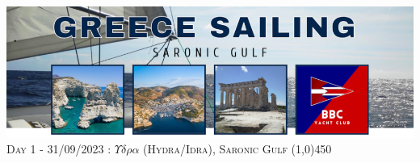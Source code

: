 \documentclass[12pt,a4paper,oneside]{article}
\begin{document}

\begin{center}
\includegraphics[scale=0.5]{../images/saronic_header_small.png} \\
{\Large \textsc{Day 1 - 31/09/2023 : $\Upsilon\delta\rho\alpha$ (Hydra/Idra), Saronic Gulf}}
\line(1,0){450}
\end{center}
\end{document}
